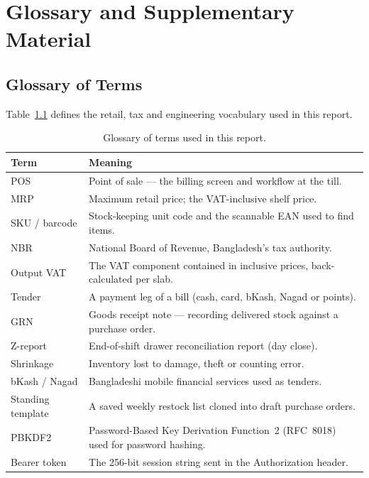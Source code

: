 \documentclass[12pt,a4paper]{report}
\begin{document}
\appendix

\chapter{Glossary and Supplementary Material}
\label{app:glossary}

\section{Glossary of Terms}
Table~\ref{tab:glossary} defines the retail, tax and engineering vocabulary used in this
report.

\begin{table}[H]
\centering
\caption{Glossary of terms used in this report.}
\label{tab:glossary}
\small
\begin{tabularx}{\textwidth}{l X}
\toprule
\textbf{Term} & \textbf{Meaning} \\
\midrule
POS & Point of sale --- the billing screen and workflow at the till. \\
MRP & Maximum retail price; the VAT-inclusive shelf price. \\
SKU / barcode & Stock-keeping unit code and the scannable EAN used to find items. \\
NBR & National Board of Revenue, Bangladesh's tax authority. \\
Output VAT & The VAT component contained in inclusive prices, back-calculated per slab. \\
Tender & A payment leg of a bill (cash, card, bKash, Nagad or points). \\
GRN & Goods receipt note --- recording delivered stock against a purchase order. \\
Z-report & End-of-shift drawer reconciliation report (day close). \\
Shrinkage & Inventory lost to damage, theft or counting error. \\
bKash / Nagad & Bangladeshi mobile financial services used as tenders. \\
Standing template & A saved weekly restock list cloned into draft purchase orders. \\
PBKDF2 & Password-Based Key Derivation Function~2 (RFC~8018) used for password hashing. \\
Bearer token & The 256-bit session string sent in the Authorization header. \\

\end{tabularx}
\end{table}
\end{document}
